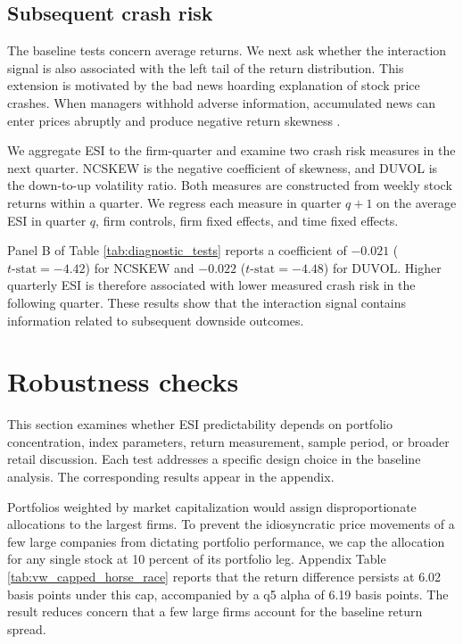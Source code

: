 \documentclass[12pt]{article}
\begin{document}
\subsection{Subsequent crash risk}

The baseline tests concern average returns. We next ask whether the interaction signal is also associated with the left tail of the return distribution. This extension is motivated by the bad news hoarding explanation of stock price crashes. When managers withhold adverse information, accumulated news can enter prices abruptly and produce negative return skewness \citep{hutton2009,kim2011}.

We aggregate ESI to the firm-quarter and examine two crash risk measures in the next quarter. NCSKEW is the negative coefficient of skewness, and DUVOL is the down-to-up volatility ratio. Both measures are constructed from weekly stock returns within a quarter. We regress each measure in quarter $q+1$ on the average ESI in quarter $q$, firm controls, firm fixed effects, and time fixed effects.

Panel B of Table \ref{tab:diagnostic_tests} reports a coefficient of $-0.021$ ($t\text{-stat}=-4.42$) for NCSKEW and $-0.022$ ($t\text{-stat}=-4.48$) for DUVOL. Higher quarterly ESI is therefore associated with lower measured crash risk in the following quarter. These results show that the interaction signal contains information related to subsequent downside outcomes.


\section{Robustness checks} \label{sec:robustness_checks}

This section examines whether ESI predictability depends on portfolio concentration, index parameters, return measurement, sample period, or broader retail discussion. Each test addresses a specific design choice in the baseline analysis. The corresponding results appear in the appendix.

Portfolios weighted by market capitalization would assign disproportionate allocations to the largest firms. To prevent the idiosyncratic price movements of a few large companies from dictating portfolio performance, we cap the allocation for any single stock at 10 percent of its portfolio leg. Appendix Table \ref{tab:vw_capped_horse_race} reports that the return difference persists at 6.02 basis points under this cap, accompanied by a q5 alpha of 6.19 basis points. The result reduces concern that a few large firms account for the baseline return spread.
\end{document}
